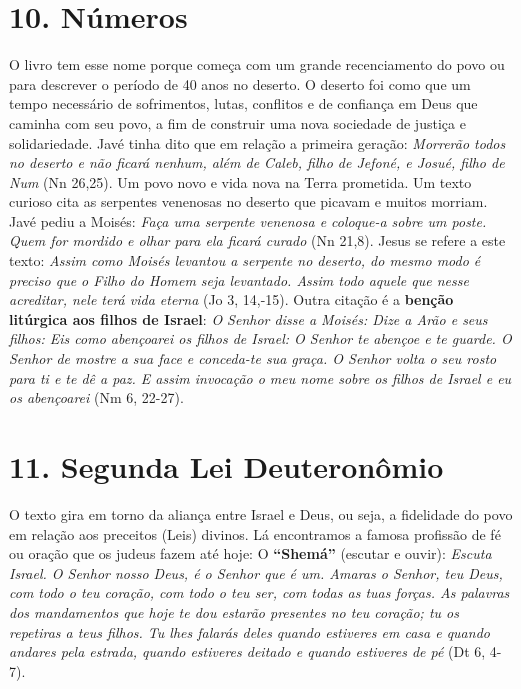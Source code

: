 \documentclass[
]{book}
\begin{document}
\hypertarget{nuxfameros}{%
\section*{10. Números}\label{nuxfameros}}

O livro tem esse nome porque começa com um grande recenciamento do povo ou para descrever o período de 40 anos no deserto. O deserto foi como que um tempo necessário de sofrimentos, lutas, conflitos e de confiança em Deus que caminha com seu povo, a fim de construir uma nova sociedade de justiça e solidariedade. Javé tinha dito que em relação a primeira geração: \emph{Morrerão todos no deserto e não ficará nenhum, além de Caleb, filho de Jefoné, e Josué, filho de Num} (Nn 26,25). Um povo novo e vida nova na Terra prometida. Um texto curioso cita as serpentes venenosas no deserto que picavam e muitos morriam. Javé pediu a Moisés: \emph{Faça uma serpente venenosa e coloque-a sobre um poste. Quem for mordido e olhar para ela ficará curado} (Nn 21,8). Jesus se refere a este texto: \emph{Assim como Moisés levantou a serpente no deserto, do mesmo modo é preciso que o Filho do Homem seja levantado. Assim todo aquele que nesse acreditar, nele terá vida eterna} (Jo 3, 14,-15). Outra citação é a \textbf{benção litúrgica aos filhos de Israel}: \emph{O Senhor disse a Moisés: Dize a Arão e seus filhos: Eis como abençoarei os filhos de Israel: O Senhor te abençoe e te guarde. O Senhor de mostre a sua face e conceda-te sua graça. O Senhor volta o seu rosto para ti e te dê a paz. E assim invocação o meu nome sobre os filhos de Israel e eu os abençoarei} (Nm 6, 22-27).

\hypertarget{segunda-lei-deuteronuxf4mio}{%
\section*{11. Segunda Lei Deuteronômio}\label{segunda-lei-deuteronuxf4mio}}

O texto gira em torno da aliança entre Israel e Deus, ou seja, a fidelidade do povo em relação aos preceitos (Leis) divinos. Lá encontramos a famosa profissão de fé ou oração que os judeus fazem até hoje: O \textbf{``Shemá''} (escutar e ouvir): \emph{Escuta Israel. O Senhor nosso Deus, é o Senhor que é um. Amaras o Senhor, teu Deus, com todo o teu coração, com todo o teu ser, com todas as tuas forças. As palavras dos mandamentos que hoje te dou estarão presentes no teu coração; tu os repetiras a teus filhos. Tu lhes falarás deles quando estiveres em casa e quando andares pela estrada, quando estiveres deitado e quando estiveres de pé} (Dt 6, 4-7).
\end{document}
